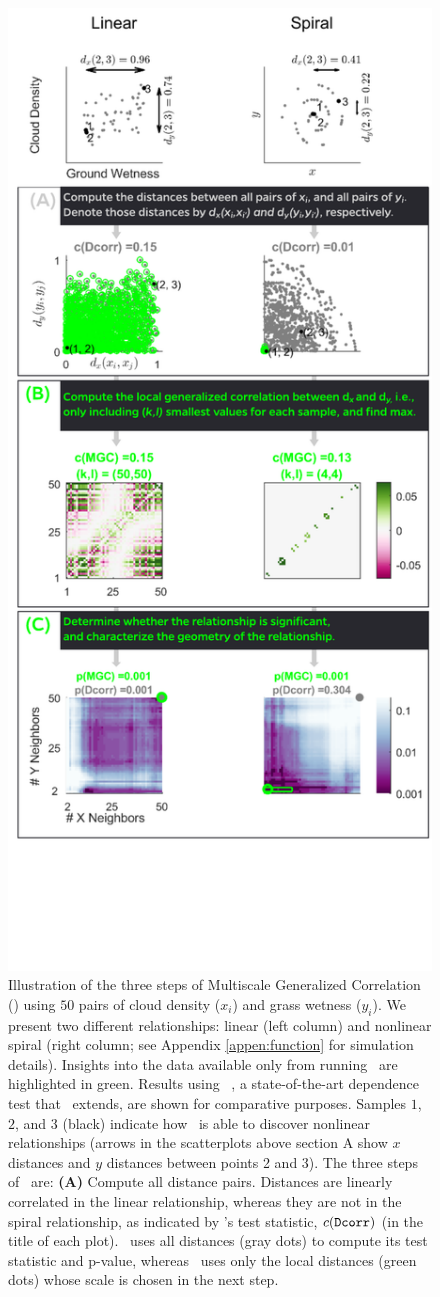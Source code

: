 \documentclass[11pt]{extarticle}
\begin{document}
\begin{figure}
\includegraphics[width=0.5\linewidth]{Figures/Fig1All}
\caption{
Illustration of the three steps of Multiscale Generalized Correlation (\Mgc)  using  $50$ pairs of cloud density ($x_i$) and grass wetness ($y_i$).
We present two different relationships:  linear (left column) and nonlinear spiral  (right column; see Appendix \ref{appen:function} for simulation details).
Insights into the data available only from running \Mgc~are highlighted in {\color{green}green.} Results using \Dcorr~\cite{SzekelyRizzo2009}, a state-of-the-art dependence test that \Mgc~extends, are shown for comparative purposes.
%
Samples $1$, $2$, and $3$ (black) indicate how \Mgc~is able to discover nonlinear relationships (arrows in the scatterplots above section A show $x$ distances and $y$ distances between points 2 and 3).
The three steps of \Mgc~are:
%
\textbf{(A)} Compute all distance pairs. Distances are linearly correlated in the linear relationship, whereas they are not in the spiral relationship, as indicated by \Dcorr's test statistic, $c({\sc \texttt{Dcorr}})$ (in the title of each plot).  \Dcorr~uses all distances (gray dots) to compute its test statistic and p-value, whereas \Mgc~uses only the local distances (green dots) whose scale is chosen in the next step.
}
\end{figure}
\end{document}
